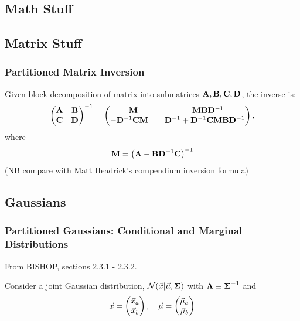 \documentclass[11pt]{article}
\begin{document}
\newpage
\begin{appendices}
  \section{Math Stuff}

  \subsection{Matrix Stuff}
  \subsubsection{Partitioned Matrix Inversion}
  Given block decomposition of matrix into submatrices
  $\mathbf{A}, \mathbf{B}, \mathbf{C}, \mathbf{D}$, the inverse is:
  \begin{equation}
    \left(
      \begin{matrix}
        \mathbf{A} & \mathbf{B} \\
        \mathbf{C} & \mathbf{D}
      \end{matrix}
    \right)^{-1}
    =
    \left(
      \begin{matrix}
        \mathbf{M}                     & - \mathbf{M} \mathbf{B} \mathbf{D}^{-1} \\
        -\mathbf{D}^{-1} \mathbf{C} \mathbf{M} \quad & \mathbf{D}^{-1} + \mathbf{D}^{-1} \mathbf{C} \mathbf{M} \mathbf{B} \mathbf{D}^{-1}
      \end{matrix}
    \right),
  \end{equation}
  where
  \begin{equation}
    \mathbf{M} = \left(\mathbf{A} - \mathbf{B} \mathbf{D}^{-1} \mathbf{C} \right)^{-1}
  \end{equation}
  (NB compare with Matt Headrick's compendium inversion formula)


\subsection{Gaussians}
\subsubsection{Partitioned Gaussians: Conditional and Marginal Distributions}
From BISHOP, sections 2.3.1 - 2.3.2.

Consider a joint Gaussian distribution, $\mathcal{N}(\vec{x} | \vec{\mu}, \boldsymbol{\Sigma})$ with
$\boldsymbol{\Lambda} \equiv \boldsymbol{\Sigma}^{-1}$ and
\begin{equation}
  \vec{x} =
  \left(
    \begin{matrix}
      \vec{x}_a \\
      \vec{x}_b
    \end{matrix}
  \right)
  , \quad
  \vec{\mu} =
  \left(
    \begin{matrix}
      \vec{\mu}_a \\
      \vec{\mu}_b
    \end{matrix}
  \right)
\end{equation}


\end{appendices}
\end{document}
